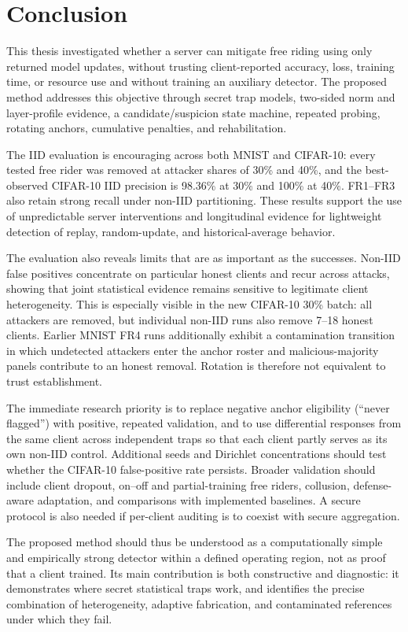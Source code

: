 \chapter{Conclusion}

This thesis investigated whether a server can mitigate free riding using only returned model updates, without trusting client-reported accuracy, loss, training time, or resource use and without training an auxiliary detector. The proposed method addresses this objective through secret trap models, two-sided norm and layer-profile evidence, a candidate/suspicion state machine, repeated probing, rotating anchors, cumulative penalties, and rehabilitation.

The IID evaluation is encouraging across both MNIST and CIFAR-10: every tested free rider was removed at attacker shares of 30\% and 40\%, and the best-observed CIFAR-10 IID precision is 98.36\% at 30\% and 100\% at 40\%. FR1--FR3 also retain strong recall under non-IID partitioning. These results support the use of unpredictable server interventions and longitudinal evidence for lightweight detection of replay, random-update, and historical-average behavior.

The evaluation also reveals limits that are as important as the successes. Non-IID false positives concentrate on particular honest clients and recur across attacks, showing that joint statistical evidence remains sensitive to legitimate client heterogeneity. This is especially visible in the new CIFAR-10 30\% batch: all attackers are removed, but individual non-IID runs also remove 7--18 honest clients. Earlier MNIST FR4 runs additionally exhibit a contamination transition in which undetected attackers enter the anchor roster and malicious-majority panels contribute to an honest removal. Rotation is therefore not equivalent to trust establishment.

The immediate research priority is to replace negative anchor eligibility (``never flagged'') with positive, repeated validation, and to use differential responses from the same client across independent traps so that each client partly serves as its own non-IID control. Additional seeds and Dirichlet concentrations should test whether the CIFAR-10 false-positive rate persists. Broader validation should include client dropout, on--off and partial-training free riders, collusion, defense-aware adaptation, and comparisons with implemented baselines. A secure protocol is also needed if per-client auditing is to coexist with secure aggregation.

The proposed method should thus be understood as a computationally simple and empirically strong detector within a defined operating region, not as proof that a client trained. Its main contribution is both constructive and diagnostic: it demonstrates where secret statistical traps work, and identifies the precise combination of heterogeneity, adaptive fabrication, and contaminated references under which they fail.
